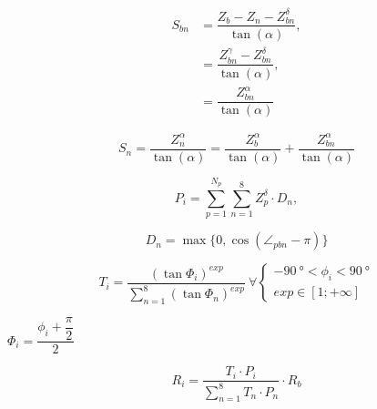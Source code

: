 \documentclass[10pt,a4paper]{article}
\begin{document}
	\begin{equation}
		\begin{split}
			S_{bn} & = \dfrac{Z_b - Z_n - Z_{bn}^{\delta}}{\tan(\alpha)}, \\
			& = \dfrac{Z_{bn}^{\gamma} - Z_{bn}^{\delta}}{\tan(\alpha)}, \\	
			& = \dfrac{Z_{bn}^{\alpha}}{\tan(\alpha)}
		\end{split}
	\end{equation}

	\begin{equation}
			S_n  = \dfrac{Z_n^{\alpha}}{\tan(\alpha)} = \dfrac{Z_b^{\alpha}}{\tan(\alpha)} + \dfrac{Z_{bn}^{\alpha}}{\tan(\alpha)} 
	\end{equation}

	\begin{equation}\label{equation:persistence}
		P_i = \sum_{p = 1}^{N_p} \sum_{n=1}^{8} Z^\delta_{p} \cdot D_{n},
	\end{equation}

	\begin{equation}\label{equation:direction}
		D_{n} = \max \{ 0,\cos{(\angle _{pbn} - \pi)} \}
	\end{equation}

	\begin{equation} \label{equation:terrain}
		T_{i} = \dfrac{\left(\tan \Phi_i \right)^{exp}}{\sum_{n=1}^{8}\left(\tan \Phi_n \right)^{exp}} \ \forall \begin{cases}
			\SI{-90}{\degree} < \phi_i < \SI{90}{\degree} \\
			exp \in \left[1; +\infty \right]
		\end{cases}
	\end{equation}

	$\Phi_i = \dfrac{\phi_i + \dfrac{\pi}{2}}{2}$
	
	\begin{equation}\label{equation:routing}
		R_i = \dfrac{T_i \cdot P_i}{\sum_{n=1}^{8} T_n \cdot P_n} \cdot R_b 
	\end{equation}
	
\end{document}

